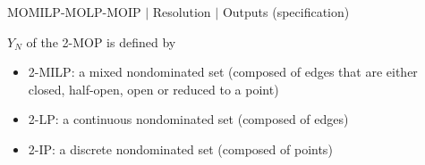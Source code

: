 \documentclass[10pt,xcolor=dvipsnames]{beamer}
\newcommand{\red}{\textcolor{red}}
\newcommand{\grey}{\textcolor{black!25}}
\begin{document}
%
% 
\begin{frame}{MOMILP-MOLP-MOIP $\mid$ Resolution $\mid$ Outputs (specification)}

$Y_N$ of the 2-MOP is defined by 
\begin{itemize}
  \item \grey{2-MILP: a mixed nondominated set (composed of edges that are either closed, half-open, open or reduced to a point)}
  \item \grey{2-LP: a continuous nondominated set (composed of edges)}
  \item 2-IP: a discrete nondominated set (composed of points)
\end{itemize}  

%

\end{frame}

%
% 
\end{document}
